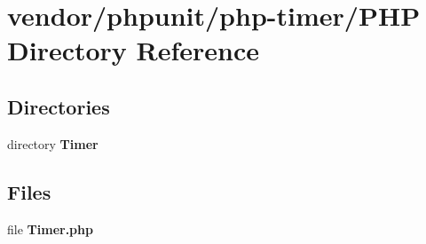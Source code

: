 \section{vendor/phpunit/php-\/timer/\+P\+H\+P Directory Reference}
\label{dir_c8b4b85f6e32598df68c596ce4cc4302}
\subsection*{Directories}
\begin{DoxyCompactItemize}
\item 
directory {\bf Timer}
\end{DoxyCompactItemize}
\subsection*{Files}
\begin{DoxyCompactItemize}
\item 
file {\bf Timer.\+php}
\end{DoxyCompactItemize}
